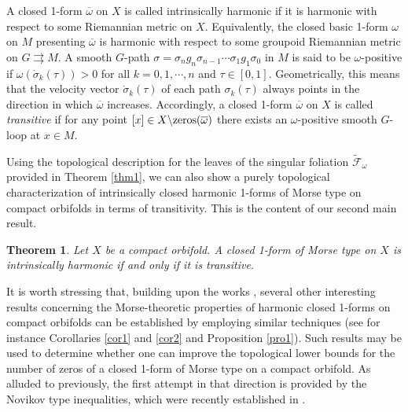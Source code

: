 \documentclass[
  a4paper, 
  reqno, 
  oneside, 
  12pt
]{amsart}
\newtheorem{theorem}{Theorem}[section]
\theoremstyle{definition}
\theoremstyle{remark}
\newcommand{\rr}{\rightrightarrows}
\begin{document}
A closed 1-form $\overline{\omega}$ on $X$ is called intrinsically harmonic if it is harmonic with respect to some Riemannian metric on $X$. Equivalently, the closed basic 1-form $\omega$ on $M$ presenting $\overline{\omega}$ is harmonic with respect to some groupoid Riemannian metric on $G\rr M$. A smooth $G$-path $\sigma=\sigma_ng_n\sigma_{n-1}\cdots \sigma_1g_1\sigma_0$ in $M$ is said to be $\omega$-positive if $\omega(\dot{\sigma}_k(\tau))>0$ for all $k=0,1,\cdots,n$ and $\tau\in [0,1]$. Geometrically, this means that the velocity vector $\dot{\sigma}_k(\tau)$ of each path $\sigma_k(\tau)$ always points in the direction in which $\overline{\omega}$ increases. Accordingly, a closed 1-form $\overline{\omega}$ on $X$ is called \emph{transitive} if for any point $[x]\in X\backslash \textnormal{zeros}(\overline{\omega})$ there exists an $\omega$-positive smooth $G$-loop at $x\in M$. 

Using the topological description for the leaves of the singular foliation $\tilde{\mathcal{F}}_\omega$ provided in Theorem \ref{thm1}, we can also show a purely topological characterization of intrinsically closed harmonic 1-forms of Morse type on compact orbifolds in terms of transitivity. This is the content of our second main result.

\begin{theorem}\label{thm3}
	Let $X$ be a compact orbifold. A closed 1-form of Morse type on $X$ is intrinsically harmonic if and only if it is transitive. 
\end{theorem}

It is worth stressing that, building upon the works \cite{FKL,Honda}, several other interesting results concerning the Morse-theoretic properties of harmonic closed 1-forms on compact orbifolds can be established by employing similar techniques (see for instance Corollaries \ref{cor1} and \ref{cor2} and Proposition \ref{pro1}). Such results may be used to determine whether one can improve the topological lower bounds for the number of zeros of a closed 1-form of Morse type on a compact orbifold. As alluded to previously, the first attempt in that direction is provided by the Novikov type inequalities, which were recently established in \cite{V}.
\end{document}
